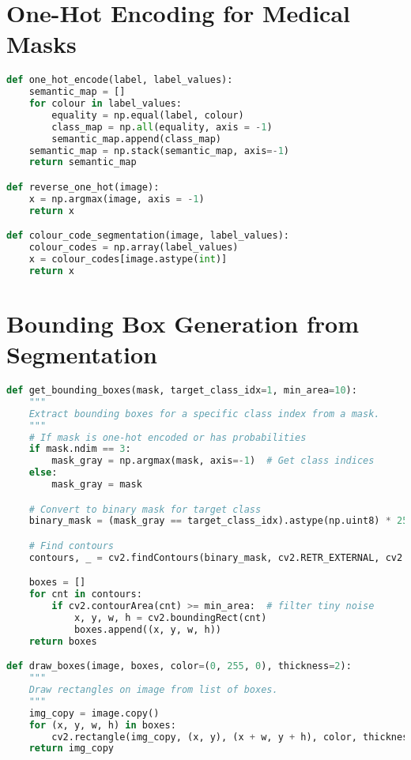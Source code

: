 \documentclass[12pt,a4paper]{report}
\begin{document}
\section{One-Hot Encoding for Medical Masks}
\begin{lstlisting}[language=Python, caption=One-Hot Encoding Implementation]
def one_hot_encode(label, label_values):
    semantic_map = []
    for colour in label_values:
        equality = np.equal(label, colour)
        class_map = np.all(equality, axis = -1)
        semantic_map.append(class_map)
    semantic_map = np.stack(semantic_map, axis=-1)
    return semantic_map

def reverse_one_hot(image):
    x = np.argmax(image, axis = -1)
    return x

def colour_code_segmentation(image, label_values):
    colour_codes = np.array(label_values)
    x = colour_codes[image.astype(int)]
    return x
\end{lstlisting}

\section{Bounding Box Generation from Segmentation}
\begin{lstlisting}[language=Python, caption=Bounding Box Generation]
def get_bounding_boxes(mask, target_class_idx=1, min_area=10):
    """
    Extract bounding boxes for a specific class index from a mask.
    """
    # If mask is one-hot encoded or has probabilities
    if mask.ndim == 3:
        mask_gray = np.argmax(mask, axis=-1)  # Get class indices
    else:
        mask_gray = mask

    # Convert to binary mask for target class
    binary_mask = (mask_gray == target_class_idx).astype(np.uint8) * 255

    # Find contours
    contours, _ = cv2.findContours(binary_mask, cv2.RETR_EXTERNAL, cv2.CHAIN_APPROX_SIMPLE)

    boxes = []
    for cnt in contours:
        if cv2.contourArea(cnt) >= min_area:  # filter tiny noise
            x, y, w, h = cv2.boundingRect(cnt)
            boxes.append((x, y, w, h))
    return boxes

def draw_boxes(image, boxes, color=(0, 255, 0), thickness=2):
    """
    Draw rectangles on image from list of boxes.
    """
    img_copy = image.copy()
    for (x, y, w, h) in boxes:
        cv2.rectangle(img_copy, (x, y), (x + w, y + h), color, thickness)
    return img_copy
\end{lstlisting}
\end{document}
